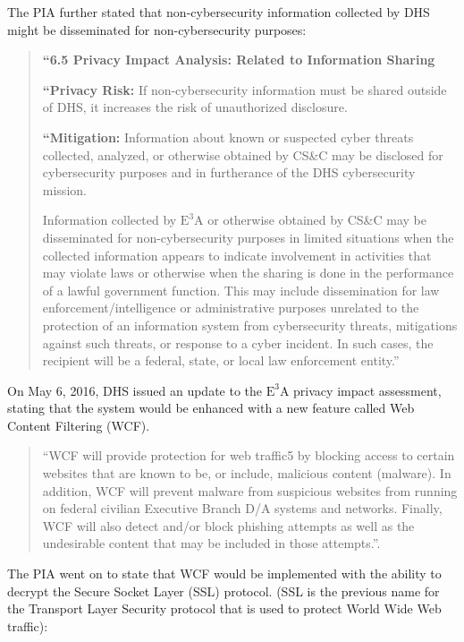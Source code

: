 \documentclass[fleqn,10pt]{wlscirep}
\newcommand{\ETA}{$\textrm{E}^\textrm{3}\textrm{A}$\xspace}
\begin{document}
The PIA further stated that non-cybersecurity information collected by
DHS might be disseminated for non-cybersecurity purposes:

\begin{quote}
  \textbf{``6.5 Privacy Impact Analysis: Related to Information Sharing}

  \textbf{``Privacy Risk:} If non-cybersecurity information must be shared outside of DHS, it
increases the risk of unauthorized disclosure.

  \textbf{``Mitigation:} Information about known or suspected cyber threats collected,
analyzed, or otherwise obtained by CS\&C may be disclosed for cybersecurity purposes
and in furtherance of the DHS cybersecurity mission.

Information collected by \ETA or otherwise obtained by CS\&C may be
disseminated for non-cybersecurity purposes in limited situations when the collected
information appears to indicate involvement in activities that may violate laws or
otherwise when the sharing is done in the performance of a lawful government function.
This may include dissemination for law enforcement/intelligence or administrative
purposes unrelated to the protection of an information system from cybersecurity threats,
mitigations against such threats, or response to a cyber incident. In such cases, the
recipient will be a federal, state, or local law enforcement entity.''\cite[p.23]{dhs-e3a-pia}
\end{quote}

On May 6, 2016, DHS issued an update to the \ETA privacy impact
assessment, stating that the system would be enhanced with a new
feature called Web Content Filtering (WCF).

\begin{quote}
``WCF will provide protection for web traffic5
by blocking
access to certain websites that are known to be, or include, malicious content (malware). In
addition, WCF will prevent malware from suspicious websites from running on federal civilian
Executive Branch D/A systems and networks. Finally, WCF will also detect and/or block phishing
attempts as well as the undesirable content that may be included in
those attempts.''\cite[p.2]{dhs-e3a-pia2}.
\end{quote}

The PIA went on to state that WCF would be implemented with the
ability to decrypt the Secure Socket Layer (SSL) protocol. (SSL is the
previous name for the Transport Layer Security protocol that is used
to protect World Wide Web traffic):
\end{document}
